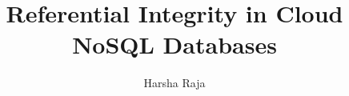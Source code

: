 \documentclass[11pt, a4paper, twoside, openright]{report}
\title{Referential Integrity in Cloud \ac{NoSQL} Databases}
\author{Harsha Raja}
\begin{document}
\frontmatter

 

\begin{abstract}
\small
\end{abstract}

 \maketitle

\tableofcontents

 
\listoftodos



\mainmatter

\acresetall

%
% 
\acresetall

% 
% 

\acresetall


% 
\acresetall 
%

\acresetall 
%
 

\backmatter

\appendix




\end{document}
